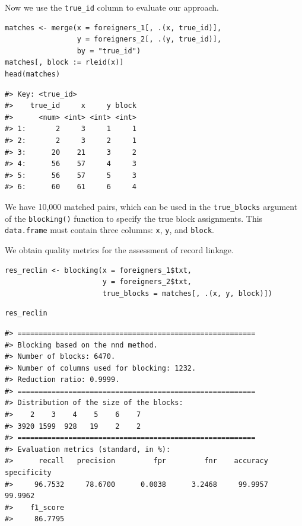 Now we use the \texttt{true\_id} column to evaluate our approach.

\begin{verbatim}
matches <- merge(x = foreigners_1[, .(x, true_id)],
                 y = foreigners_2[, .(y, true_id)],
                 by = "true_id")
matches[, block := rleid(x)]
head(matches)
\end{verbatim}

\begin{verbatim}
#> Key: <true_id>
#>    true_id     x     y block
#>      <num> <int> <int> <int>
#> 1:       2     3     1     1
#> 2:       2     3     2     1
#> 3:      20    21     3     2
#> 4:      56    57     4     3
#> 5:      56    57     5     3
#> 6:      60    61     6     4
\end{verbatim}

We have 10,000 matched pairs, which can be used in the \texttt{true\_blocks}
argument of the \texttt{blocking()} function to specify the true block
assignments. This \texttt{data.frame} must contain three columns: \texttt{x}, \texttt{y}, and
\texttt{block}.

We obtain quality metrics for the assessment of record linkage.

\begin{verbatim}
res_reclin <- blocking(x = foreigners_1$txt,
                       y = foreigners_2$txt,
                       true_blocks = matches[, .(x, y, block)])
\end{verbatim}


\begin{verbatim}
res_reclin
\end{verbatim}

\begin{verbatim}
#> ========================================================
#> Blocking based on the nnd method.
#> Number of blocks: 6470.
#> Number of columns used for blocking: 1232.
#> Reduction ratio: 0.9999.
#> ========================================================
#> Distribution of the size of the blocks:
#>    2    3    4    5    6    7 
#> 3920 1599  928   19    2    2 
#> ========================================================
#> Evaluation metrics (standard, in %):
#>      recall   precision         fpr         fnr    accuracy specificity 
#>     96.7532     78.6700      0.0038      3.2468     99.9957     99.9962 
#>    f1_score 
#>     86.7795
\end{verbatim}

